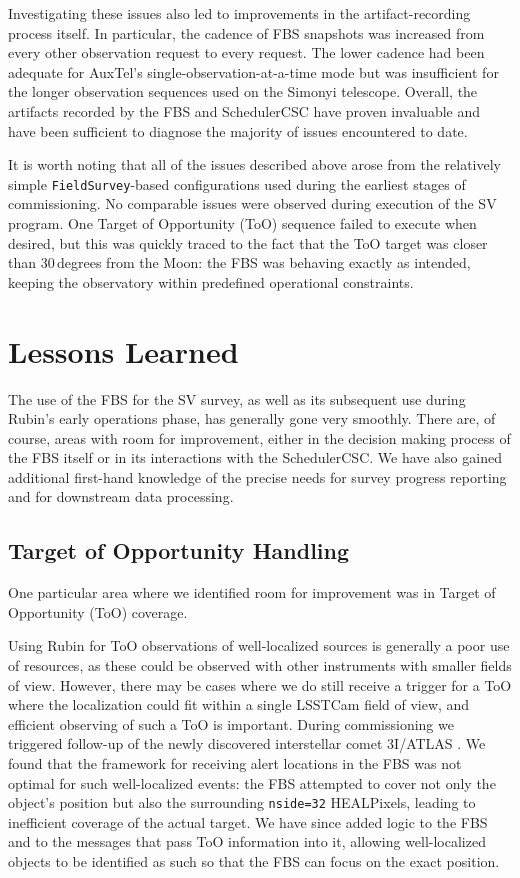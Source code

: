 Investigating these issues also led to improvements in the artifact-recording
process itself. In particular, the cadence of FBS snapshots was increased from
every other observation request to every request. The lower cadence had been
adequate for AuxTel's single-observation-at-a-time mode but was insufficient
for the longer observation sequences used on the Simonyi telescope. Overall,
the artifacts recorded by the FBS and SchedulerCSC have proven invaluable and
have been sufficient to diagnose the majority of issues encountered to date.

It is worth noting that all of the issues described above arose from the
relatively simple \texttt{FieldSurvey}-based configurations used during the
earliest stages of commissioning. No comparable issues were observed during
execution of the SV program. One Target of Opportunity (ToO) sequence failed
to execute when desired, but this was quickly traced to the fact that the ToO
target was closer than 30\,degrees from the Moon: the FBS was behaving exactly
as intended, keeping the observatory within predefined operational constraints. 


\section{Lessons Learned}\label{sec:lessonslearned}


The use of the FBS for the SV survey, as well as its subsequent use during
Rubin's early operations phase, has generally gone very smoothly. There are, of
course, areas with room for improvement, either in the decision making process of the FBS
itself or in its interactions with the SchedulerCSC. We have also gained
additional first-hand knowledge of the precise needs for survey progress
reporting and for downstream data processing.

\subsection{Target of Opportunity Handling}

One particular area where we identified room for improvement was in Target of
Opportunity (ToO) coverage. 

Using Rubin for ToO observations of well-localized sources is generally a poor use
of resources, as these could be observed with other instruments with smaller fields of view.
However, there may be cases where we do still receive a trigger for a ToO where the
localization could fit within a single LSSTCam field of view, and efficient observing
of such a ToO is important. During commissioning we triggered follow-up of the newly discovered
interstellar comet 3I/ATLAS \cite{2026ApJ..1001L..35C}. We found that the framework for receiving alert
locations in the FBS was not optimal for such well-localized events: the FBS
attempted to cover not only the object's position but also the surrounding
\texttt{nside=32} HEALPixels, leading to inefficient coverage of the actual
target. We have since added logic to the FBS and to the messages that pass ToO
information into it, allowing well-localized objects to be identified as such so
that the FBS can focus on the exact position.

